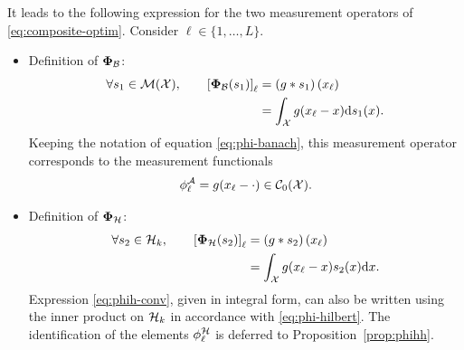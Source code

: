 \documentclass[12pt]{article}
\begin{document}
            It leads to the following expression for the two measurement operators of \eqref{eq:composite-optim}. Consider $\ell \in \{1, \dots, L\}$.
            \begin{itemize}
                \item Definition of $\bm{\Phi}_\mathcal{B}$:
            \begin{equation}
                \label{eq:phib-conv}
                \begin{split}
                \forall s_1 \in {\mathcal{M}}({\mathcal{X}}), \qquad \left[\bm{\Phi}_\mathcal{B}(s_1)\right]_\ell &= \left(g*s_1\right)(x_\ell) \\
                &= \int_{\mathcal{X}} g(x_\ell - x) \mathrm{d}s_1(x).
            \end{split}
            \end{equation}
            Keeping the notation of equation \eqref{eq:phi-banach}, this measurement operator corresponds to the measurement functionals
            $$\phi^\mathcal{A}_\ell = g(x_\ell - \cdot) \in {\mathcal{C}}_0({\mathcal{X}}).$$
                \item Definition of $\bm{\Phi}_\mathcal{H}$:
            \begin{equation}
                \label{eq:phih-conv}
                \begin{split}
                \forall s_2 \in \mathcal{H}_k, \qquad\left[\bm{\Phi}_\mathcal{H}(s_2)\right]_\ell &= \left(g*s_2\right)(x_\ell) \\
                &= \int_{\mathcal{X}} g(x_\ell - x) s_2(x) \mathrm{d}x.
                \end{split}
            \end{equation}
            Expression \eqref{eq:phih-conv}, given in integral form, can also be written using the inner product on $\mathcal{H}_k$ in accordance with \eqref{eq:phi-hilbert}. The identification of the elements $\phi^\mathcal{H}_\ell$ is deferred to Proposition~\ref{prop:phihh}.
            \end{itemize}
\end{document}
